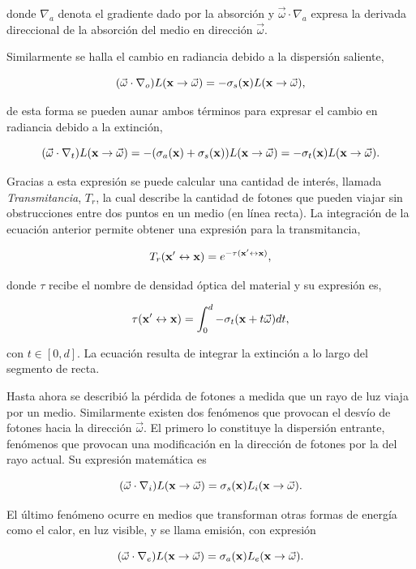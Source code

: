 donde $\nabla_{a}$ denota el gradiente dado por la absorción y $ \vec{\omega} \cdot \nabla_{a}$ expresa la derivada direccional de la absorción del medio en dirección $\vec{\omega}$.

Similarmente se halla el cambio en radiancia debido a la dispersión saliente,

$$ (\vec{\omega} \cdot \nabla_{o}) L(\bold{x} \rightarrow \vec{\omega}) = -\sigma_{s}(\bold{x}) L(\bold{x} \rightarrow \vec{\omega}),$$

de esta forma se pueden aunar ambos términos para expresar el cambio en radiancia debido a la extinción,

$$(\vec{\omega} \cdot \nabla_{t}) L(\bold{x} \rightarrow \vec{\omega}) = -(\sigma_{a}(\bold{x})+\sigma_{s}(\bold{x})) L(\bold{x} \rightarrow \vec{\omega}) = -\sigma_{t}(\bold{x}) L(\bold{x} \rightarrow \vec{\omega}).$$

Gracias a esta expresión se puede calcular una cantidad de interés, llamada {\em Transmitancia}, $T_{r}$, la cual describe la cantidad de fotones que pueden viajar sin obstrucciones entre dos puntos en un medio (en línea recta).
La integración de la ecuación anterior permite obtener una expresión para la transmitancia,

$$T_{r}(\bold{x'} \leftrightarrow \bold{x}) = e^{-\tau(\bold{x'} \leftrightarrow \bold{x})},$$

donde $\tau$ recibe el nombre de densidad óptica del material y su expresión es,

$$\tau(\bold{x'} \leftrightarrow \bold{x}) = \int_{0}^{d} -\sigma_{t}(\bold{x}+t\vec{\omega})dt,$$

con $t \in [0,d]$.
La ecuación resulta de integrar la extinción a lo largo del segmento de recta.


Hasta ahora se describió la pérdida de fotones a medida que un rayo de luz viaja por un medio.
Similarmente existen dos fenómenos que provocan el desvío de fotones hacia la dirección $\vec{\omega}$.
El primero lo constituye la dispersión entrante, fenómenos que provocan una modificación en la dirección de fotones por la del rayo actual.
Su expresión matemática es

$$ (\vec{\omega} \cdot \nabla_{i}) L(\bold{x} \rightarrow \vec{\omega}) = \sigma_{s}(\bold{x}) L_{i}(\bold{x} \rightarrow \vec{\omega}).$$

El último fenómeno ocurre en medios que transforman otras formas de energía como el calor, en luz visible, y se llama emisión, con expresión

$$ (\vec{\omega} \cdot \nabla_{e}) L(\bold{x} \rightarrow \vec{\omega}) = \sigma_{a}(\bold{x}) L_{e}(\bold{x} \rightarrow \vec{\omega}).$$

